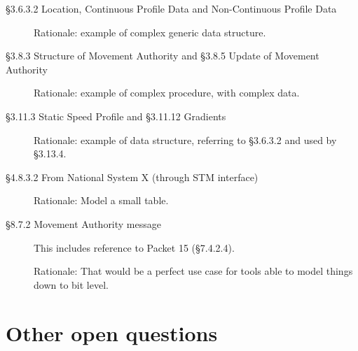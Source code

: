 \documentclass{template/openetcs_article}
\begin{document}
\begin{description}
\item [§3.6.3.2 Location, Continuous Profile Data and Non-Continuous
  Profile Data]

  Rationale: example of complex generic data structure.

\item [§3.8.3 Structure of Movement Authority and §3.8.5 Update of
  Movement Authority]

  Rationale: example of complex procedure, with complex data.

\item [§3.11.3 Static Speed Profile and §3.11.12 Gradients]

  Rationale: example of data structure, referring to §3.6.3.2 and used
  by §3.13.4.

\item [§4.8.3.2 From National System X (through STM interface)]

  Rationale: Model a small table. 

\item [§8.7.2 Movement Authority message] This includes reference to
  Packet 15 (§7.4.2.4). 

  Rationale: That would be a perfect use case for tools able to model
  things down to bit level.
\end{description}

\section{Other open questions}

\end{document}
